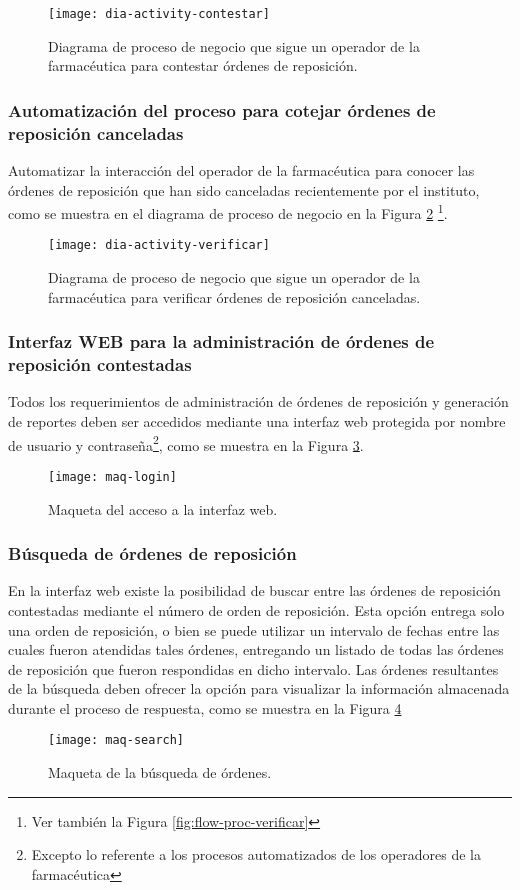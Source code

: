 \begin{figure}[h]
  \centering
  \texttt{[image: dia-activity-contestar]}
  \caption{Diagrama de proceso de negocio que sigue un operador de la farmacéutica para contestar órdenes de reposición.}
  \label{fig:dia-activity-contestar}
\end{figure}

\subsubsection{Automatización del proceso para cotejar órdenes de reposición canceladas}
Automatizar la interacción del operador de la farmacéutica para conocer las órdenes de reposición que han sido canceladas recientemente por el instituto, como se muestra en el diagrama de proceso de negocio en la Figura \ref{fig:dia-activity-verificar} \footnote{
Ver también la Figura \ref{fig:flow-proc-verificar}}.
\begin{figure}[h]
  \centering
  \texttt{[image: dia-activity-verificar]}
  \caption{Diagrama de proceso de negocio que sigue un operador de la farmacéutica para verificar órdenes de reposición canceladas.}
  \label{fig:dia-activity-verificar}
\end{figure}

\subsubsection{Interfaz WEB para la administración de órdenes de reposición contestadas}
Todos los requerimientos de administración de órdenes de reposición y generación de reportes deben ser accedidos mediante una interfaz web protegida por nombre de usuario y contraseña\footnote{Excepto lo referente a los procesos automatizados de los operadores de la farmacéutica}, como se muestra en la Figura \ref{fig:maq-login}.
\begin{figure}[h]
  \centering
  \texttt{[image: maq-login]} 
  \caption{Maqueta del acceso a la interfaz web.}
  \label{fig:maq-login}
\end{figure} 

\subsubsection{Búsqueda de órdenes de reposición}
En la interfaz web existe la posibilidad de buscar entre las órdenes de reposición contestadas mediante el número de orden de reposición. Esta opción entrega solo una orden de reposición, o bien se puede utilizar un intervalo de fechas entre las cuales fueron atendidas tales órdenes, entregando un listado de todas las órdenes de reposición que fueron respondidas en dicho intervalo. Las órdenes resultantes de la búsqueda deben ofrecer la opción para visualizar la información almacenada durante el proceso de respuesta, como se muestra en la Figura \ref{fig:maq-search}
\begin{figure}[h]
  \centering
  \texttt{[image: maq-search]} 
  \caption{Maqueta de la búsqueda de órdenes.}
  \label{fig:maq-search}
\end{figure} 

